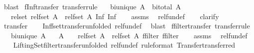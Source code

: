 \begin{isabellebody}
\ blast%
\endisatagproof
{\isafoldproof}%
%
\isadelimproof
\isanewline
%
\endisadelimproof
\isanewline
\isanewline
\isanewline
{}\isamarkupfalse%
\ fInf{\isacharunderscore}transfer\ {\isacharbrackleft}transfer{\isacharunderscore}rule{\isacharbrackright}{\isacharcolon}\isanewline
\ \ \ {\isachardoublequoteopen}bi{\isacharunderscore}unique\ A{\isachardoublequoteclose}\ \ {\isachardoublequoteopen}bi{\isacharunderscore}total\ A{\isachardoublequoteclose}\isanewline
\ \ \ {\isachardoublequoteopen}{\isacharparenleft}rel{\isacharunderscore}set\ {\isacharparenleft}rel{\isacharunderscore}fset\ A{\isacharparenright}\ {\isacharequal}{\isacharequal}{\isacharequal}{\isachargreater}\ rel{\isacharunderscore}fset\ A{\isacharparenright}\ Inf\ Inf{\isachardoublequoteclose}\isanewline
%
\isadelimproof
\ \ %
\endisadelimproof
%
\isatagproof
{}\isamarkupfalse%
\ assms\ \isamarkupfalse%
\ rel{\isacharunderscore}fun{\isacharunderscore}def\isanewline
\ \ \isamarkupfalse%
\ clarify\isanewline
\ \ \isamarkupfalse%
\ transfer{\isacharprime}\isanewline
\ \ \isamarkupfalse%
\ Inf{\isacharunderscore}fset{\isacharunderscore}transfer{\isacharbrackleft}unfolded\ rel{\isacharunderscore}fun{\isacharunderscore}def{\isacharbrackright}\ \isamarkupfalse%
\ blast%
\endisatagproof
{\isafoldproof}%
%
\isadelimproof
\isanewline
%
\endisadelimproof
\isanewline
{}\isamarkupfalse%
\ ffilter{\isacharunderscore}transfer\ {\isacharbrackleft}transfer{\isacharunderscore}rule{\isacharbrackright}{\isacharcolon}\isanewline
\ \ \ {\isachardoublequoteopen}bi{\isacharunderscore}unique\ A{\isachardoublequoteclose}\isanewline
\ \ \ {\isachardoublequoteopen}{\isacharparenleft}{\isacharparenleft}A\ {\isacharequal}{\isacharequal}{\isacharequal}{\isachargreater}\ {\isacharparenleft}{\isacharequal}{\isacharparenright}{\isacharparenright}\ {\isacharequal}{\isacharequal}{\isacharequal}{\isachargreater}\ rel{\isacharunderscore}fset\ A\ {\isacharequal}{\isacharequal}{\isacharequal}{\isachargreater}\ rel{\isacharunderscore}fset\ A{\isacharparenright}\ ffilter\ ffilter{\isachardoublequoteclose}\isanewline
%
\isadelimproof
\ \ %
\endisadelimproof
%
\isatagproof
{}\isamarkupfalse%
\ assms\ \isamarkupfalse%
\ rel{\isacharunderscore}fun{\isacharunderscore}def\isanewline
\ \ \isamarkupfalse%
\ Lifting{\isacharunderscore}Set{\isachardot}filter{\isacharunderscore}transfer{\isacharbrackleft}unfolded\ rel{\isacharunderscore}fun{\isacharunderscore}def{\isacharcomma}\ rule{\isacharunderscore}format{\isacharcomma}\ Transfer{\isachardot}transferred{\isacharbrackright}\ \isamarkupfalse%

\end{isabellebody}
